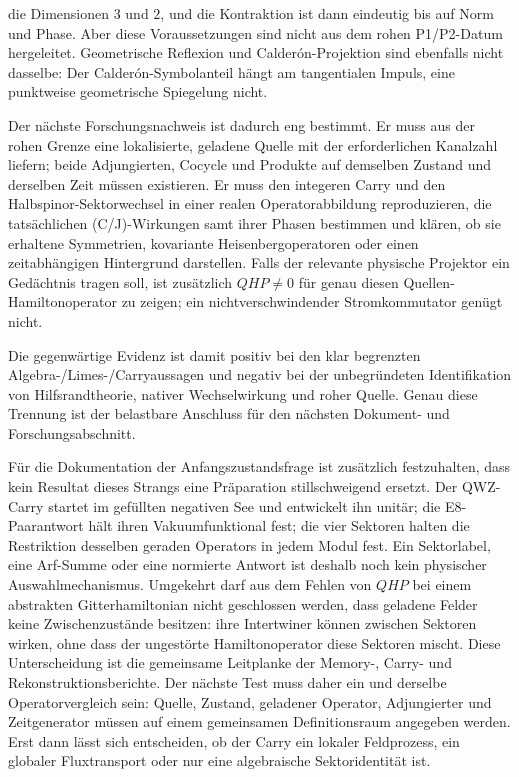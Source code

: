 \documentclass[11pt,a4paper,oneside,parskip=half,headings=normal,numbers=noenddot,bibliography=totoc]{scrreprt}
\begin{document}
die Dimensionen $3$ und $2$, und die Kontraktion ist dann eindeutig bis
auf Norm und Phase. Aber diese Voraussetzungen sind nicht aus dem rohen
P1/P2-Datum hergeleitet. Geometrische Reflexion und Calderón-Projektion sind
ebenfalls nicht dasselbe: Der Calderón-Symbolanteil hängt am tangentialen
Impuls, eine punktweise geometrische Spiegelung nicht.

Der nächste Forschungsnachweis ist dadurch eng bestimmt. Er muss aus der
rohen Grenze eine lokalisierte, geladene Quelle mit der erforderlichen
Kanalzahl liefern; beide Adjungierten, Cocycle und Produkte auf demselben
Zustand und derselben Zeit müssen existieren. Er muss den integeren Carry und
den Halbspinor-Sektorwechsel in einer realen Operatorabbildung reproduzieren,
die tatsächlichen (C/J)-Wirkungen samt ihrer Phasen bestimmen und klären,
ob sie erhaltene Symmetrien, kovariante Heisenbergoperatoren oder einen
zeitabhängigen Hintergrund darstellen. Falls der relevante physische
Projektor ein Gedächtnis tragen soll, ist zusätzlich \(QHP\ne0\) für genau
diesen Quellen-Hamiltonoperator zu zeigen; ein nichtverschwindender
Stromkommutator genügt nicht.

Die gegenwärtige Evidenz ist damit positiv bei den klar begrenzten
Algebra-/Limes-/Carryaussagen und negativ bei der unbegründeten Identifikation
von Hilfsrandtheorie, nativer Wechselwirkung und roher Quelle. Genau diese
Trennung ist der belastbare Anschluss für den nächsten Dokument- und
Forschungsabschnitt.

Für die Dokumentation der Anfangszustandsfrage ist zusätzlich festzuhalten,
dass kein Resultat dieses Strangs eine Präparation stillschweigend ersetzt.
Der QWZ-Carry startet im gefüllten negativen See und entwickelt ihn unitär;
die E8-Paarantwort hält ihren Vakuumfunktional fest; die vier Sektoren halten
die Restriktion desselben geraden Operators in jedem Modul fest. Ein
Sektorlabel, eine Arf-Summe oder eine normierte Antwort ist deshalb noch kein
physischer Auswahlmechanismus. Umgekehrt darf aus dem Fehlen von
\(QHP\) bei einem abstrakten Gitterhamiltonian nicht geschlossen werden, dass
geladene Felder keine Zwischenzustände besitzen: ihre Intertwiner können
zwischen Sektoren wirken, ohne dass der ungestörte Hamiltonoperator diese
Sektoren mischt. Diese Unterscheidung ist die gemeinsame Leitplanke der
Memory-, Carry- und Rekonstruktionsberichte. Der nächste Test muss daher ein
und derselbe Operatorvergleich sein: Quelle, Zustand, geladener Operator,
Adjungierter und Zeitgenerator müssen auf einem gemeinsamen Definitionsraum
angegeben werden. Erst dann lässt sich entscheiden, ob der Carry ein lokaler
Feldprozess, ein globaler Fluxtransport oder nur eine algebraische
Sektoridentität ist.
\end{document}
